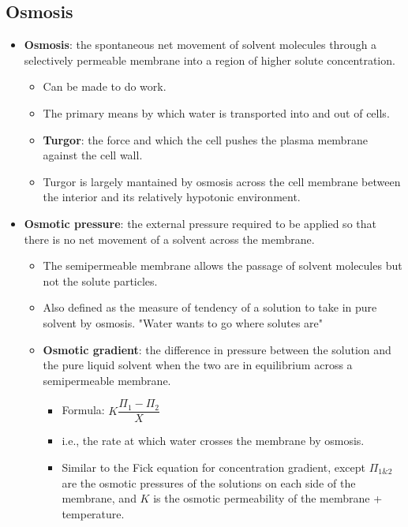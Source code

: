 \documentclass[12pt,a4paper]{article}
\begin{document}
\subsection{Osmosis}
\begin{itemize}
    \item \textbf{Osmosis}: the spontaneous net movement of solvent molecules through a selectively permeable membrane into a region of higher solute concentration.
        \begin{itemize}
            \item Can be made to do work.
            \item The primary means by which {\color{o-Sun}water} is transported into and out of cells.
            \item \textbf{Turgor}: the force and which the cell pushes the plasma membrane against the cell wall.
            \item Turgor is largely mantained by osmosis across the cell membrane between the interior and its relatively hypotonic environment.
        \end{itemize}
    \item \textbf{Osmotic pressure}: the external pressure required to be applied so that there is no net movement of a solvent across the membrane.
        \begin{itemize}
            \item The semipermeable membrane allows the passage of solvent molecules but not the solute particles.
            \item Also defined as the measure of tendency of a solution to take in pure solvent by osmosis. {\color{G-Moon}"Water wants to go where solutes are"}
            \item \textbf{Osmotic gradient}: the difference in pressure between the solution and the pure liquid solvent when the two are in equilibrium across a semipermeable membrane.
                \begin{itemize}
                    \item Formula: \(K\dfrac{\Pi_1 - \Pi_2}{X}\)
                    \item i.e., the {\color{o-Sun}rate} at which water crosses the membrane by osmosis.
                    \item Similar to the Fick equation for concentration gradient, except $\Pi_{1\&2}$ are the osmotic pressures of the solutions on each side of the membrane, and \(K\) is the osmotic permeability of the membrane + temperature.
                \end{itemize}

\end{itemize}
\end{itemize}
\end{document}

